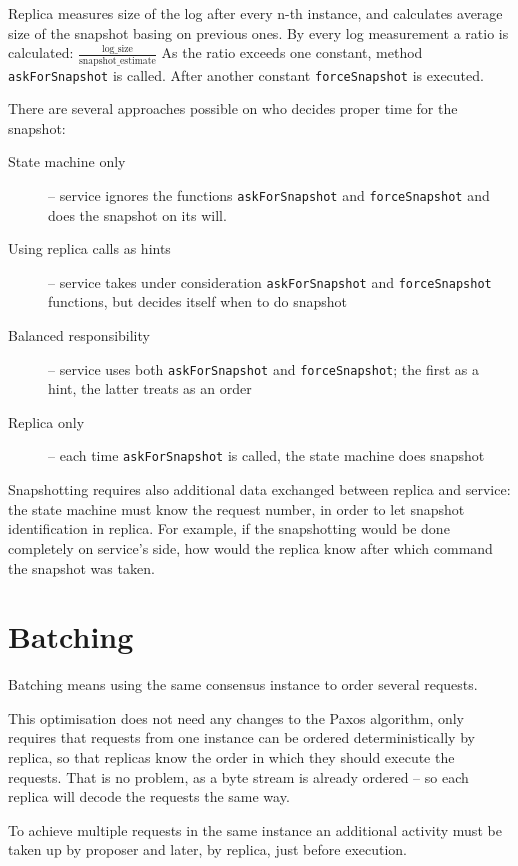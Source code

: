 Replica measures size of the log after every n-th instance, and calculates average size of the snapshot basing on previous ones. By every log measurement a ratio is calculated: $\frac{ \text{log\_size} }{ \text{snapshot\_estimate} }$ As the ratio exceeds one constant, method \texttt{askForSnapshot} is called. After another constant \texttt{forceSnapshot} is executed.

There are several approaches possible on who decides proper time for the snapshot:
\begin{description} 
 \item[State machine only] -- service ignores the functions \texttt{askForSnapshot} and \texttt{forceSnapshot} and does the snapshot on its will.
 \item[Using replica calls as hints] -- service takes under consideration \texttt{askForSnapshot} and \texttt{fo\-rce\-Snapshot} functions, but decides itself when to do snapshot
 \item[Balanced responsibility] -- service uses both \texttt{askForSnapshot} and \texttt{forceSnapshot}; the first as a hint, the latter treats as an order
 \item[Replica only] -- each time \texttt{askForSnapshot} is called, the state machine does snapshot
\end{description}

Snapshotting requires also additional data exchanged between replica and service: the state machine must know the request number, in order to let snapshot identification in replica. For example, if the snapshotting would be done completely on service's side, how would the replica know after which command the snapshot was taken.


\section{Batching}
\label{sec:batching}
Batching means using the same consensus instance to order several requests.

This optimisation does not need any changes to the Paxos algorithm, only requires that requests from one instance can be ordered deterministically by replica, so that replicas know the order in which they should execute the requests. That is no problem, as a byte stream is already ordered -- so each replica will decode the requests the same way.

To achieve multiple requests in the same instance an additional activity must be taken up by proposer and later, by replica, just before execution.

